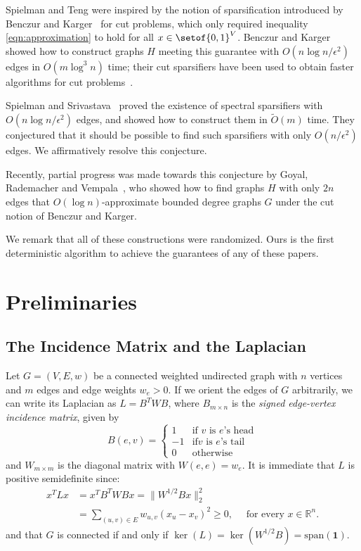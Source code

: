 \documentclass[12pt]{article}
\newcommand{\onevec}{\mathbf{1}}
\newcommand{\R}{\mathbb{R}}
\def\softO#1{\widetilde{{O}} \left( #1 \right)}
\def\bigO#1{{{O}}\left( #1 \right) }
\begin{document}
Spielman and Teng were inspired by the notion of sparsification introduced by Benczur
  and Karger~\cite{BenczurKarger} for cut problems, which only
  required 
  inequality \eqref{eqn:approximation} to hold for all $x \in \setof{0,1}^{V}$.
Benczur and Karger showed how to construct graphs $H$ meeting this guarantee
  with  $\bigO{n \log n / \epsilon ^{2}}$ edges in $\bigO{m \log^{3} n}$ time;
 their cut sparsifiers have been used to obtain faster algorithms
  for cut problems~\cite{BenczurKarger,krv}.


Spielman and Srivastava~\cite{SpielmanSrivastava} proved the
  existence of spectral sparsifiers with $\bigO {n \log n / \epsilon ^{2}}$
  edges, and showed how to construct them in $\softO{m}$ time.
They conjectured that it should be possible to find such sparsifiers with only
  $\bigO{n / \epsilon ^{2}}$ edges.
We affirmatively resolve this conjecture.

Recently, partial progress was made towards this conjecture
  by Goyal, Rademacher and Vempala~\cite{GoyalRademacherVempala},
  who showed how to find graphs $H$ with only $2n$ edges that 
  $\bigO {\log n}$-approximate bounded degree graphs
  $G$ under the cut notion of Benczur and Karger.

We remark that all of these constructions were randomized.
Ours is the first deterministic algorithm to achieve the guarantees of any
  of these papers.


\section{Preliminaries}
\subsection{The Incidence Matrix and the Laplacian} \label{sec:incidence}
Let $G=(V,E,w)$ be a connected weighted undirected graph with $n$ vertices and $m$
edges and edge weights $w_e > 0$. If we orient the edges of $G$
arbitrarily, we can write its Laplacian as $L=B^{T} WB$, where $B_{m\times n}$ is the
{\em signed edge-vertex incidence matrix}, given by
\[ B(e,v)= \left\{\begin{array}{ll} 1 &\textrm{if $v$ is $e$'s head}\\ -1 &\textrm{if
$v$ is $e$'s tail}\\ 0 & \textrm{otherwise}\end{array}\right.\]
and $W_{m\times m}$ is the diagonal matrix with $W(e,e)=w_e$. 
It is immediate that $L$ is positive semidefinite since:
\begin{align*}
 x^{T} Lx &=
  x^{T} B^{T} WBx =
 \|W^{1/2}Bx\|_2^2
 \\&=\sum_{(u,v) \in E} w_{u,v} (x_{u} - x_{v})^{2}
 \ge 0,
\quad\textrm{ for every $x\in\R^n$.}\end{align*}
\noindent and that $G$ is connected if and only if
 $\ker(L)=\ker(W^{1/2}B)=\textrm{span}(\onevec)$.
\end{document}
